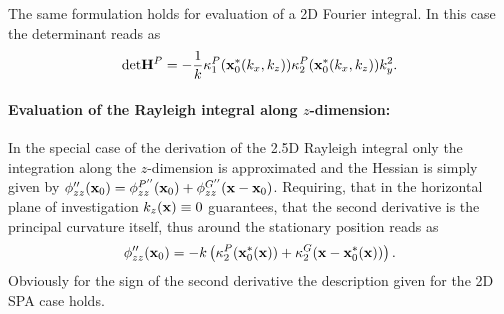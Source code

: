 The same formulation holds for evaluation of a 2D Fourier integral.
In this case the determinant reads as
\begin{equation}
\mathrm{det} \mathbf{H}^P  = -\frac{1}{k} \kappa_1^P(\mathbf{x}_0^*(k_x,k_z)) \kappa_2^P(\mathbf{x}_0^*(k_x,k_z	)) k_y^2.
\end{equation}


\paragraph{Evaluation of the Rayleigh integral along $z$-dimension:}
In the special case of the derivation of the 2.5D Rayleigh integral only the integration along the $z$-dimension is approximated and the Hessian is simply given by $\phi''_{zz}(\mathbf{x}_0) =\phi^{P''}_{zz}(\mathbf{x}_0) + \phi^{G''}_{zz}(\mathbf{x}-\mathbf{x}_0)$.
Requiring, that in the horizontal plane of investigation $k_z(\mathbf{x}) \equiv 0$ guarantees, that the second derivative is the principal curvature itself, thus around the stationary position reads as
\begin{equation}
\phi''_{zz}(\mathbf{x}_0) = -k \left( \kappa_2^P(\mathbf{x}_0^*(\mathbf{x})) + \kappa_2^G(\mathbf{x}-\mathbf{x}_0^*(\mathbf{x})) \right).
\end{equation}
Obviously for the sign of the second derivative the description given for the 2D SPA case holds.

